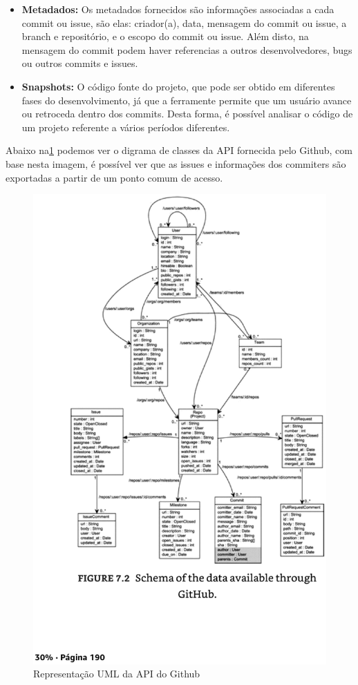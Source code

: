 \begin{itemize}
\item \textbf{Metadados:} Os metadados fornecidos são informações associadas a cada
commit ou issue, são elas: criador(a), data, mensagem do commit ou issue, a branch e repositório,
e o escopo do commit ou issue. Além disto, na mensagem do commit podem haver referencias a outros
desenvolvedores, bugs ou outros commits e issues.
\item \textbf{Snapshots:} O código fonte do projeto, que pode ser obtido em diferentes
fases do desenvolvimento, já que a ferramente permite que um usuário avance ou retroceda
dentro dos commits. Desta forma, é possível analisar o código de um projeto referente
a vários períodos diferentes.
\end{itemize}

Abaixo na\ref{github_api} podemos ver o digrama de classes da API fornecida pelo
Github, com base nesta imagem, é possível ver que as issues e informações dos commiters
são exportadas a partir de um ponto comum de acesso.

\begin{figure}[h]
    \centering
    \label{github_api}
        \includegraphics[keepaspectratio=true,scale=0.3]{figuras/github_api_diagram.eps}
    \caption{Representação UML da API do Github}
\end{figure}

